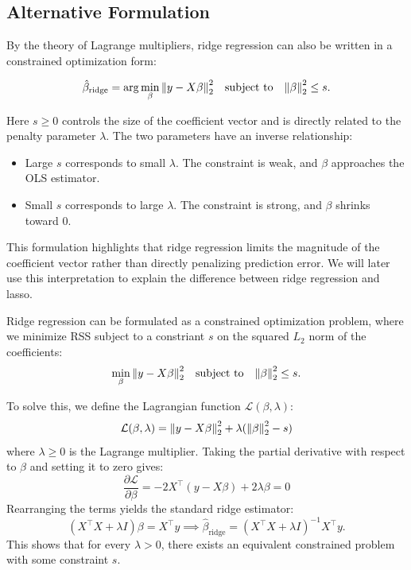\documentclass[
  letterpaper,
  DIV=11,
  numbers=noendperiod]{scrreprt}
\providecommand{\tightlist}{%
  \setlength{\itemsep}{0pt}\setlength{\parskip}{0pt}}
\newcommand{\ridge}{\mathrm{ridge}}
\theoremstyle{definition}
\theoremstyle{definition}
\theoremstyle{plain}
\theoremstyle{plain}
\theoremstyle{remark}
\begin{document}
\subsection{Alternative Formulation}\label{alternative-formulation}

By the theory of Lagrange multipliers, ridge regression can also be
written in a constrained optimization form:

\[
\hat{\beta}_{\ridge}
=
\arg\min_{\beta} \norm{y-X\beta}_2^2
\quad
\text{subject to}
\quad
\norm{\beta}_2^2 \le s .
\]

Here \(s \ge 0\) controls the size of the coefficient vector and is
directly related to the penalty parameter \(\lambda\). The two
parameters have an inverse relationship:

\begin{itemize}
\tightlist
\item
  Large \(s\) corresponds to small \(\lambda\). The constraint is weak,
  and \(\beta\) approaches the OLS estimator.
\item
  Small \(s\) corresponds to large \(\lambda\). The constraint is
  strong, and \(\beta\) shrinks toward \(0\).
\end{itemize}

This formulation highlights that ridge regression limits the magnitude
of the coefficient vector rather than directly penalizing prediction
error. We will later use this interpretation to explain the difference
between ridge regression and lasso.

\begin{tcolorbox}[enhanced jigsaw, arc=.35mm, bottomrule=.15mm, bottomtitle=1mm, breakable, colback=white, colbacktitle=quarto-callout-note-color!10!white, colframe=quarto-callout-note-color-frame, coltitle=black, left=2mm, leftrule=.75mm, opacityback=0, opacitybacktitle=0.6, rightrule=.15mm, title=\textcolor{quarto-callout-note-color}{\faInfo}\hspace{0.5em}{The Constrained Optimization Problem}, titlerule=0mm, toprule=.15mm, toptitle=1mm]

Ridge regression can be formulated as a constrained optimization
problem, where we minimize RSS subject to a constriant \(s\) on the
squared \(L_2\) norm of the coefficients: \[
\min_{\beta} \norm{y - X\beta}_2^2 \quad \text{subject to} \quad \norm{\beta}_2^2 \le s.
\]

To solve this, we define the Lagrangian function
\(\mathcal{L}(\beta, \lambda)\): \[
\mathcal{L}(\beta, \lambda) = \norm{y - X\beta}_2^2 + \lambda (\norm{\beta}_2^2 - s)
\] where \(\lambda \ge 0\) is the Lagrange multiplier. Taking the
partial derivative with respect to \(\beta\) and setting it to zero
gives: \[
\frac{\partial \mathcal{L}}{\partial \beta} = -2X^\top(y - X\beta) + 2\lambda\beta = 0
\] Rearranging the terms yields the standard ridge estimator: \[
(X^\top X + \lambda I)\beta = X^\top y \implies \hat{\beta}_{\text{ridge}} = (X^\top X + \lambda I)^{-1} X^\top y.
\] This shows that for every \(\lambda > 0\), there exists an equivalent
constrained problem with some constraint \(s\).

\end{tcolorbox}
\end{document}
